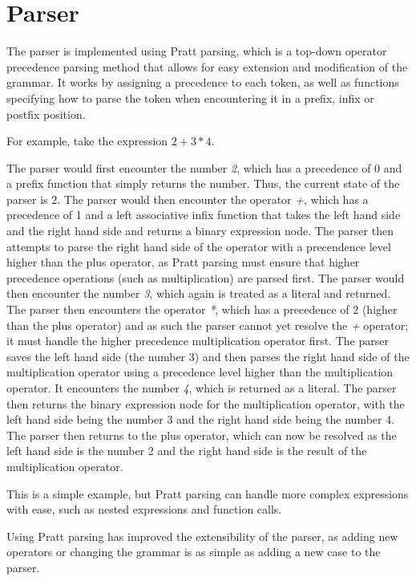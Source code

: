 \section{Parser}\label{sec:parser}

The parser is implemented using Pratt parsing\citep{pratt1973top}, which is a top-down operator precedence parsing 
method that allows for easy extension and modification of the grammar.
It works by assigning a precedence to each token, as well as functions specifying how to parse the token when 
encountering it in a prefix, infix or postfix position.

For example, take the expression $2 + 3 * 4$.

The parser would first encounter the number \textit{2}, which has a precedence of 0 and a prefix function that
simply returns the number.
Thus, the current state of the parser is $2$.
The parser would then encounter the operator \textit{+}, which has a precedence of 1 and a left associative infix
function that takes the left hand side and the right hand side and returns a binary expression node.
The parser then attempts to parse the right hand side of the operator with a precendence level higher than the
plus operator, as Pratt parsing must ensure that higher precedence operations (such as multiplication) are parsed
first.
The parser would then encounter the number \textit{3}, which again is treated as a literal and returned.
The parser then encounters the operator \textit{*}, which has a precedence of 2 (higher than the plus operator) and 
as such the parser cannot yet resolve the \textit{+} operator; it must handle the higher precedence multiplication
operator first.
The parser saves the left hand side (the number 3) and then parses the right hand side of the multiplication 
operator using a precedence level higher than the multiplication operator.
It encounters the number \textit{4}, which is returned as a literal.
The parser then returns the binary expression node for the multiplication operator, with the left hand side being
the number 3 and the right hand side being the number 4.
The parser then returns to the plus operator, which can now be resolved as the left hand side is the number 2 and the
right hand side is the result of the multiplication operator.

This is a simple example, but Pratt parsing can handle more complex expressions with ease, such as nested
expressions and function calls.

Using Pratt parsing has improved the extensibility of the parser, as adding new operators or changing the grammar
is as simple as adding a new case to the parser.

